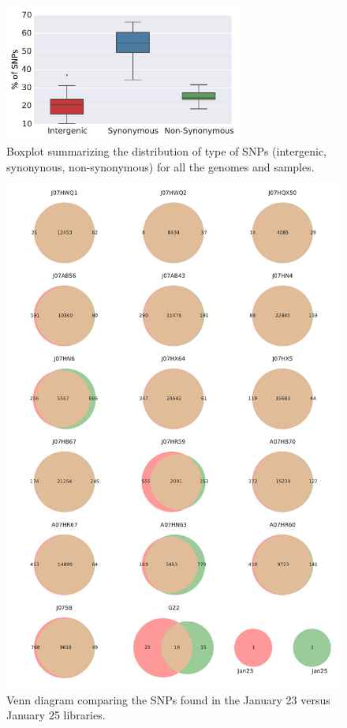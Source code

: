 \begin{figure}[ht]
  \centering
  \includegraphics[width=0.7\textwidth,keepaspectratio]{Chapter5/Figures/BoxPlot_TypeofSNPs.pdf}
  \caption{Boxplot summarizing the distribution of type of SNPs (intergenic, synonynous, non-synonymous) for all the genomes and samples.}
  \label{BoxPlotSNP}
\end{figure}

\begin{figure}[!hbtp]
  \centering
  \includegraphics[width=\textwidth,height=0.9\textheight,keepaspectratio]{Chapter5/Figures/Venn_JanuarySNPs.pdf}
  \caption{Venn diagram comparing the SNPs found in the January 23 versus January 25 libraries.}
  \label{VennJan}
\end{figure}


